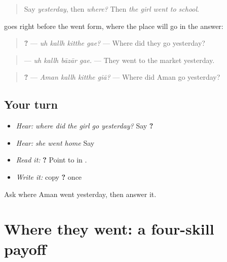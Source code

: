 \label{lesson:PA-C216-where-did-they-go}



\begin{quote}
Say \emph{yesterday}, then \emph{where?} Then \emph{the girl went to school}.
\end{quote}

\begin{grammarlens}[title={Grammar Lens: asking where}]
\textbf{} goes right before the went form, where the place will go in the answer:

\begin{quote}
\textbf{   ?} — \emph{uh kallh kitthe gae?} — Where did they go yesterday?
\end{quote}

\begin{quote}
\textbf{   } — \emph{uh kallh bāzār gae.} — They went to the market yesterday.
\end{quote}

\begin{quote}
\textbf{   ?} — \emph{Aman kallh kitthe giā?} — Where did Aman go yesterday?
\end{quote}
\end{grammarlens}

\subsection*{Your turn}
\begin{itemize}
\raggedright
  \item \emph{Hear:} \emph{where did the girl go yesterday?} Say \textbf{   ?}
  \item \emph{Hear:} \emph{she went home} Say \textbf{  }
  \item \emph{Read it:} \textbf{   ?} Point to \textbf{} in \textbf{}.
  \item \emph{Write it:} copy \textbf{   ?} once
\end{itemize}

\begin{tcolorbox}[breakable,colback=teal!4,colframe=teal!35!black,title={Before you move on}]
Ask where Aman went yesterday, then answer it.
\end{tcolorbox}
\section[\texorpdfstring{\pa{ਉਹ} \pa{ਕੱਲ੍ਹ} \pa{ਕਿੱਥੇ} \pa{ਗਏ}? (uh kallh kitthe gae?)}{ਉਹ ਕੱਲ੍ਹ ਕਿੱਥੇ ਗਏ? (uh kallh kitthe gae?)}]{Where they went: a four-skill payoff}

